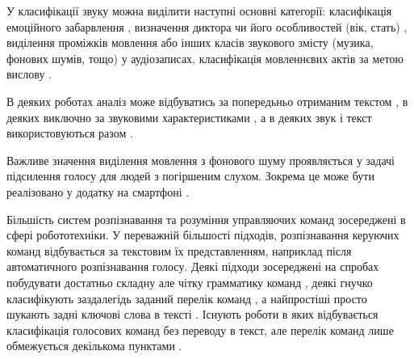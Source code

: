 
У класифікації звуку можна виділити наступні основні категорії: класифікація емоційного забарвлення \cite{Ververidis_2004,Ververidis_2004_2,Ververidis_2006,Kaya_2017,Deb_2016,Bhaskar_2015,Devillers_2015,Weisskirchen_2017,Sharma_2018,Ozseven_2018}, визначення диктора \cite{Rabotyagov_2006} чи його особливостей (вік, стать) \cite{Kaya_2017}, виділення проміжків мовлення \cite{Hussain_2018,Khonglah_2016,Benatan_2015,Priya_2012} або інших класів звукового змісту (музика, фонових шумів, тощо) \cite{Hussain_2018,Boddapati_2017} у аудіозаписах, класифікація мовленнєвих актів за метою вислову \cite{Ko_2015,Choi_1999,Grosz_1995,En_2005,Kang_2013,Kim_2012,Lee_2002,Sridhar_2008,Webb_2005,Kang_2010,Hellbernd_2016,Su_2017}.

В деяких роботах аналіз може відбуватись за попередьньо отриманим текстом \cite{Ko_2015,Choi_1999,Grosz_1995,En_2005,Kang_2013,Kim_2012,Lee_2002,Webb_2005,Kang_2010}, в деяких виключно за звуковими характеристиками \cite{Ververidis_2004,Ververidis_2004_2,Ververidis_2006,Kaya_2017,Deb_2016,Devillers_2015,Weisskirchen_2017,Sharma_2018,Hussain_2018,Khonglah_2016,Benatan_2015,Priya_2012,Boddapati_2017,Hellbernd_2016}, а в деяких звук і текст використовуються разом \cite{Bhaskar_2015,Sridhar_2008,Chowdhury_2018}.

Важливе значення виділення мовлення з фонового шуму проявляється у задачі підсилення голосу для людей з погіршеним слухом. Зокрема це може бути реалізовано у додатку на смартфоні \cite{Vashkevich_2018}.


Більшість систем розпізнавання та розуміння управляючих команд зосереджені в сфері робототехніки. У переважній більшості підходів, розпізнавання керуючих команд відбувається за текстовим їх представленням, наприклад після автоматичного розпізнавання голосу. Деякі підходи зосереджені на спробах побудувати достатньо складну але чітку грамматику команд \cite{Misra_2016,Fasola_2013,Eppe_2016}, деякі гнучко класифікують заздалегідь заданий перелік команд \cite{Yongda_2018}, а найпростіші просто шукають задні ключові слова в тексті \cite{Shwe_2003,Shulika_2018}. Існують роботи в яких відбувається класифікація голосових команд без переводу в текст, але перелік команд лише обмежується декількома пунктами \cite{Shulika_2018,Gryshchuk_2006}.

